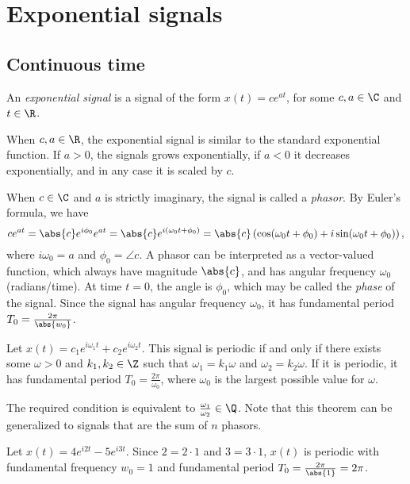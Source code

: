 \documentclass[12pt]{article}
\begin{document}
\section{Exponential signals}

\subsection{Continuous time}

\begin{defn}
    An \emph{exponential signal} is a signal of the form $x(t) = ce^{at}$, for some $c, a \in \C$ and $t \in \R$.
\end{defn}

When $c, a \in \R$, the exponential signal is similar to the standard exponential function. If $a > 0$, the signals grows exponentially, if $a < 0$ it decreases exponentially, and in any case it is scaled by $c$.

When $c \in \C$ and $a$ is strictly imaginary, the signal is called a \emph{phasor}. By Euler's formula, we have \[ce^{at} = \abs{c}e^{i\phi_0}e^{at} = \abs{c}e^{i(\omega_0t + \phi_0)} = \abs{c}\left(\cos(\omega_0t + \phi_0) + i\sin(\omega_0t + \phi_0)\right),\] where $i\omega_0 = a$ and $\phi_0 = \angle c$. A phasor can be interpreted as a vector-valued function, which always have magnitude $\abs{c}$, and has angular frequency $\omega_0$ (radians/time). At time $t = 0$, the angle is $\phi_0$, which may be called the \emph{phase} of the signal. Since the signal has angular frequency $\omega_0$, it has fundamental period $T_0 = \frac{2\pi}{\abs{w_0}}$.

\begin{thm}
    Let $x(t) = c_1e^{i\omega_1t} + c_2e^{i\omega_2t}$. This signal is periodic if and only if there exists some $\omega > 0$ and $k_1, k_2 \in \Z$ such that $\omega_1 = k_1\omega$ and $\omega_2 = k_2\omega$. If it is periodic, it has fundamental period $T_0 = \frac{2\pi}{\omega_0}$, where $\omega_0$ is the largest possible value for $\omega$.
\end{thm}

\begin{rmk}
    The required condition is equivalent to $\frac{\omega_1}{\omega_2} \in \Q$. Note that this theorem can be generalized to signals that are the sum of $n$ phasors.
\end{rmk}

\begin{exmp}
    Let $x(t) = 4e^{i2t} - 5e^{i3t}$. Since $2 = 2\cdot 1$ and $3 = 3 \cdot 1$, $x(t)$ is periodic with fundamental frequency $w_0 = 1$ and fundamental period $T_0 = \frac{2\pi}{\abs{1}} = 2\pi$.
\end{exmp}
\end{document}
